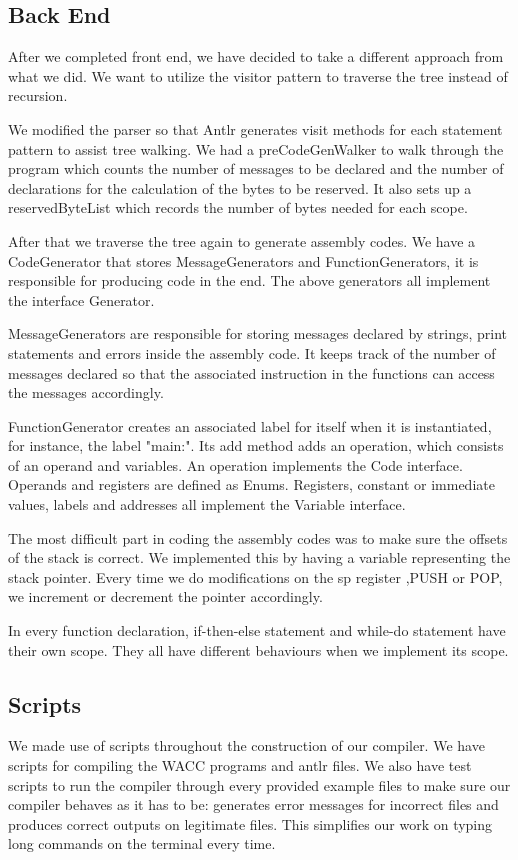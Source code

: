 \documentclass[a4paper]{article}
\theoremstyle{definition}
\begin{document}
\subsection{Back End}
After we completed front end, we have decided to take a different approach from what we did. We want to utilize the visitor pattern to traverse the tree instead of recursion.

We modified the parser so that Antlr generates visit methods for each statement pattern to assist tree walking. We had a preCodeGenWalker to walk through the program which counts the number of messages to be declared and the number of declarations for the calculation of the bytes to be reserved. It also sets up a reservedByteList which records the number of bytes needed for each scope.

After that we traverse the tree again to generate assembly codes. We have a CodeGenerator that stores MessageGenerators and FunctionGenerators, it is responsible for producing code in the end. The above generators all implement the interface Generator. 

MessageGenerators are responsible for storing messages declared by strings, print statements and errors inside the assembly code. It keeps track of the number of messages declared so that the associated instruction in the functions can access the messages accordingly.  

FunctionGenerator creates an associated label for itself when it is instantiated, for instance, the label "main:". Its add method adds an operation, which consists of an operand and variables. An operation implements the Code interface. Operands and registers are defined as Enums. Registers, constant or immediate values, labels and addresses all implement the Variable interface.

The most difficult part in coding the assembly codes was to make sure the offsets of the stack is correct. We implemented this by having a variable representing the stack pointer. Every time we do modifications on the sp register ,PUSH or POP, we increment or decrement the pointer accordingly. 

In every function declaration, if-then-else statement and while-do statement have their own scope. They all have different behaviours when we implement its scope.


\subsection{Scripts}
We made use of scripts throughout the construction of our compiler. We have scripts for compiling the WACC programs and antlr files. We also have test scripts to run the compiler through every provided example files to make sure our compiler behaves as it has to be: generates error messages for incorrect files and produces correct outputs on legitimate files. This simplifies our work on typing long commands on the terminal every time.
\end{document}
